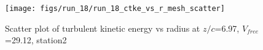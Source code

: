 \begin{figure}[H]
\centering
\texttt{[image: figs/run\_18/run\_18\_ctke\_vs\_r\_mesh\_scatter]}
\caption{Scatter plot of turbulent kinetic energy vs radius at $z/c$=6.97, $V_{free}$=29.12, station2}
\label{fig:run_18_ctke_vs_r_mesh_scatter}
\end{figure}


